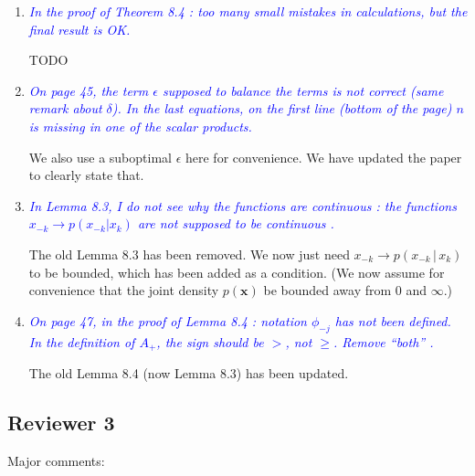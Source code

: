 \documentclass[pdftex,12pt]{article}
\def\rc#1{{\it\textcolor{blue}{#1}}\smallskip}
\begin{document}
\begin{enumerate}
\item \rc{In the proof of Theorem 8.4 : too many small mistakes in
calculations, but the final result is OK.}

TODO

\item \rc{On page 45, the term $\epsilon$ supposed to balance the terms is not correct
(same remark about $\delta$). In the last equations, on the first line (bottom
of the page) $n$ is missing in one of the scalar products.}

We also use a suboptimal $\epsilon$ here for convenience. We have updated the paper to clearly state that.

\item \rc{In Lemma 8.3, I do not see why the functions are continuous : the
functions $x_{-k} \rightarrow p(x_{-k} | x_k)$ are not supposed to be continuous .}

The old Lemma 8.3 has been removed. We now just need $x_{-k} \rightarrow p(x_{-k} \,|\, x_k)$ to be bounded, which has been added as a condition. (We now assume for convenience that the joint density $p(\mathbf{x})$ be bounded away from 0 and $\infty$.)

\item \rc{On page 47, in the proof of Lemma 8.4 : notation $\phi_{-j}$
  has not been defined.
In the definition of $A_+$, the sign should be $>$, not $\geq$. Remove ``both'' .}

The old Lemma 8.4 (now Lemma 8.3) has been updated. 


\end{enumerate}

\subsection*{Reviewer 3}


Major comments:
\end{document}

